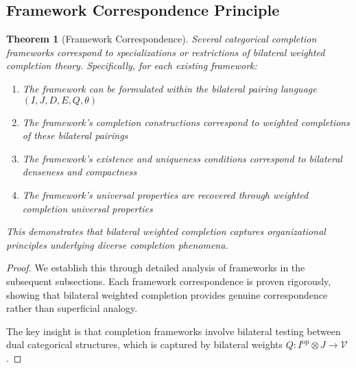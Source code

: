 \documentclass[11pt]{article}
\theoremstyle{plain}
\newtheorem{theorem}{Theorem}[section]
\theoremstyle{definition}
\theoremstyle{remark}
\newcommand{\V}{\mathcal{V}}
\newcommand{\op}{\mathrm{op}}
\begin{document}
\subsection{Framework Correspondence Principle}

\begin{theorem}[Framework Correspondence]\label{thm:framework-unification}
Several categorical completion frameworks correspond to specializations or restrictions of bilateral weighted completion theory. Specifically, for each existing framework:

\begin{enumerate}
\item The framework can be formulated within the bilateral pairing language $(I, J, D, E, Q, \theta)$
\item The framework's completion constructions correspond to weighted completions of these bilateral pairings
\item The framework's existence and uniqueness conditions correspond to bilateral denseness and compactness
\item The framework's universal properties are recovered through weighted completion universal properties
\end{enumerate}

This demonstrates that bilateral weighted completion captures organizational principles underlying diverse completion phenomena.
\end{theorem}

\begin{proof}
We establish this through detailed analysis of frameworks in the subsequent subsections. Each framework correspondence is proven rigorously, showing that bilateral weighted completion provides genuine correspondence rather than superficial analogy.

The key insight is that completion frameworks involve bilateral testing between dual categorical structures, which is captured by bilateral weights $Q : I^{\op} \otimes J \to \V$.
\end{proof}
\end{document}
